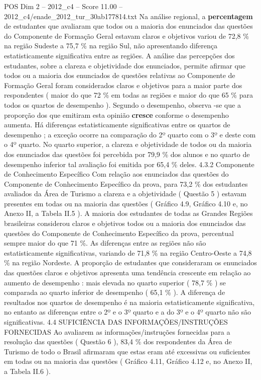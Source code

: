 \begin{textsample}{POS Dim 2 – 2012\_c4 – Score 11.00 – 2012\_c4/enade\_2012\_tur\_30ab177814.txt}
Na análise regional, a \textbf{percentagem} de estudantes que avaliaram que todos ou a maioria dos enunciados das questões do Componente de Formação Geral estavam claros e objetivos variou de 72,8 \% na região Sudeste a 75,7 \% na região Sul, não apresentando diferença estatisticamente significativa entre as regiões.
A análise das percepções dos estudantes, sobre a clareza e objetividade dos enunciados, permite afirmar que todos ou a maioria dos enunciados de questões relativas ao Componente de Formação Geral foram considerados claros e objetivos para a maior parte dos respondentes ( maior do que 72 \% em todas as regiões e maior do que 65 \% para todos os quartos de desempenho ).
Segundo o desempenho, observa -se que a proporção dos que emitiram esta opinião \textbf{cresce} conforme o desempenho aumenta.
Há diferenças estatisticamente significativas entre os quartos de desempenho ; a exceção ocorre na comparação do 2º quarto com o 3º e deste com o 4º quarto.
No quarto superior, a clareza e objetividade de todos ou da maioria dos enunciados das questões foi percebida por 79,9 \% dos alunos e no quarto de desempenho inferior tal avaliação foi emitida por 65,4 \% deles. 4.3.2 Componente de Conhecimento Específico Com relação aos enunciados das questões do Componente de Conhecimento Específico da prova, para 73,2 \% dos estudantes avaliados da Área de Turismo a clareza e a objetividade ( Questão 5 ) estavam presentes em todas ou na maioria das questões ( Gráfico 4.9, Gráfico 4.10 e, no Anexo II, a Tabela II.5 ).
A maioria dos estudantes de todas as Grandes Regiões brasileiras considerou claros e objetivos todos ou a maioria dos enunciados das questões do Componente de Conhecimento Específico da prova, percentual sempre maior do que 71 \%.
As diferenças entre as regiões não são estatisticamente significativas, variando de 71,8 \% na região Centro-Oeste a 74,8 \% na região Nordeste.
A proporção de estudantes que consideraram os enunciados das questões claros e objetivos apresenta uma tendência crescente em relação ao aumento de desempenho : mais elevada no quarto superior ( 78,7 \% ) se comparada ao quarto inferior de desempenho ( 65,1 \% ).
A diferença de resultados nos quartos de desempenho é na maioria estatisticamente significativa, no entanto as diferenças entre o 2º e o 3º quarto e a do 3º e o 4º quarto não são significativas. 4.4 SUFICIÊNCIA DAS INFORMAÇÕES/INSTRUÇÕES FORNECIDAS Ao avaliarem as informações/instruções fornecidas para a resolução das questões ( Questão 6 ), 83,4 \% dos respondentes da Área de Turismo de todo o Brasil afirmaram que estas eram até excessivas ou suficientes em todas ou na maioria das questões ( Gráfico 4.11, Gráfico 4.12 e, no Anexo II, a Tabela II.6 ).

\end{textsample}
